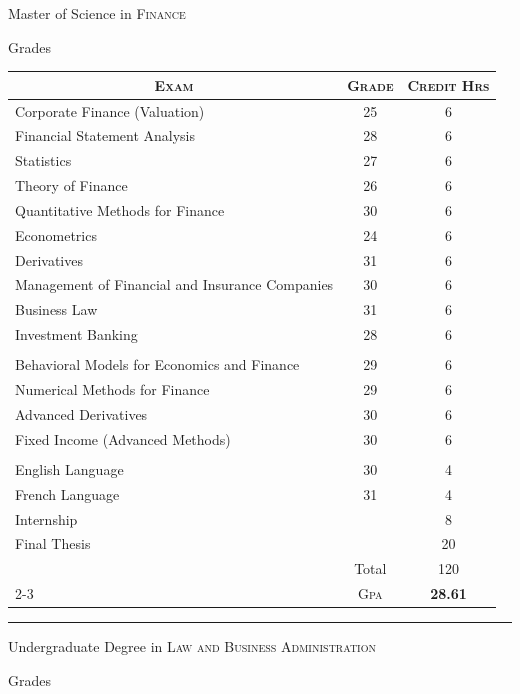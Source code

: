 \newpage
\par{\centering\Large \hypertarget{grds}{Master of Science in \textsc{Finance}}\par}\large{\centering Grades\par}\normalsize
\begin{center}

\begin{tabular}{lcc}
\multicolumn{1}{c}{\textsc{Exam}}&\textsc{Grade}&\textsc{Credit Hrs}\\ \hline
Corporate Finance (Valuation)	&25&	6\\
Financial Statement Analysis	&28&	6\\
Statistics	&27&	6\\
Theory of Finance	&26&	6\\
Quantitative Methods for Finance	&30&	6\\
Econometrics	&24	&6\\
Derivatives	&31&	6\\
Management of Financial and Insurance Companies	&30&	6\\
Business Law	&31&	6\\
Investment Banking	&28&	6\\ \\
		
Behavioral Models for Economics and Finance	&29&	6\\
Numerical Methods for Finance	&29&	6\\
Advanced Derivatives	&30&	6\\
Fixed Income (Advanced Methods)	&30&	6\\ \\
		
English Language	&30&	4\\
French Language	&31&	4\\
		
Internship	&	&8\\
		
Final Thesis	&	&20\\
		
		& Total&120\\\cline{2-3}
&\textsc{Gpa}&\textbf{28.61}
\end{tabular}
\end{center}
\bigskip
\hrule
\bigskip
\par{\centering\Large \hypertarget{grds_cleli}{Undergraduate Degree in \textsc{Law and Business Administration}}\par}\large{\centering Grades\par}\normalsize

